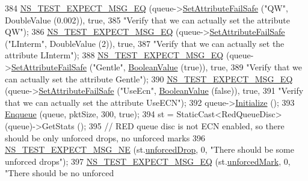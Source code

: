 \begin{DoxyCode}
384   \hyperlink{group__testing_ga7304ba46a28d8cf08dfdfd6499cf7068}{NS\_TEST\_EXPECT\_MSG\_EQ} (queue->\hyperlink{classns3_1_1ObjectBase_aa7d333004e970f925a4ed5df275541b5}{SetAttributeFailSafe} (\textcolor{stringliteral}{"QW"}, 
      DoubleValue (0.002)), \textcolor{keyword}{true},
385                          \textcolor{stringliteral}{"Verify that we can actually set the attribute QW"});
386   \hyperlink{group__testing_ga7304ba46a28d8cf08dfdfd6499cf7068}{NS\_TEST\_EXPECT\_MSG\_EQ} (queue->\hyperlink{classns3_1_1ObjectBase_aa7d333004e970f925a4ed5df275541b5}{SetAttributeFailSafe} (\textcolor{stringliteral}{"LInterm"}, 
      DoubleValue (2)), \textcolor{keyword}{true},
387                          \textcolor{stringliteral}{"Verify that we can actually set the attribute LInterm"});
388   \hyperlink{group__testing_ga7304ba46a28d8cf08dfdfd6499cf7068}{NS\_TEST\_EXPECT\_MSG\_EQ} (queue->\hyperlink{classns3_1_1ObjectBase_aa7d333004e970f925a4ed5df275541b5}{SetAttributeFailSafe} (\textcolor{stringliteral}{"Gentle"}, 
      \hyperlink{classns3_1_1BooleanValue}{BooleanValue} (\textcolor{keyword}{true})), \textcolor{keyword}{true},
389                          \textcolor{stringliteral}{"Verify that we can actually set the attribute Gentle"});
390   \hyperlink{group__testing_ga7304ba46a28d8cf08dfdfd6499cf7068}{NS\_TEST\_EXPECT\_MSG\_EQ} (queue->\hyperlink{classns3_1_1ObjectBase_aa7d333004e970f925a4ed5df275541b5}{SetAttributeFailSafe} (\textcolor{stringliteral}{"UseEcn"}, 
      \hyperlink{classns3_1_1BooleanValue}{BooleanValue} (\textcolor{keyword}{false})), \textcolor{keyword}{true},
391                          \textcolor{stringliteral}{"Verify that we can actually set the attribute UseECN"});
392   queue->\hyperlink{classns3_1_1Object_af4411cb29971772fcd09203474a95078}{Initialize} ();
393   \hyperlink{classRedQueueDiscTestCase_a231b433374e4485d83bcca3088685e31}{Enqueue} (queue, pktSize, 300, \textcolor{keyword}{true});
394   st = StaticCast<RedQueueDisc> (queue)->GetStats ();
395   \textcolor{comment}{// RED queue disc is not ECN enabled, so there should be only unforced drops, no unforced marks}
396   \hyperlink{group__testing_ga6d4b162d26b8a930115b97dd5f3d9ed9}{NS\_TEST\_EXPECT\_MSG\_NE} (st.\hyperlink{structns3_1_1RedQueueDisc_1_1Stats_a242027f6eb7d30e2cd636c52080e2c73}{unforcedDrop}, 0, \textcolor{stringliteral}{"There should be some
       unforced drops"});
397   \hyperlink{group__testing_ga7304ba46a28d8cf08dfdfd6499cf7068}{NS\_TEST\_EXPECT\_MSG\_EQ} (st.\hyperlink{structns3_1_1RedQueueDisc_1_1Stats_aa974fb3ee97c612e0a6d77259a3672df}{unforcedMark}, 0, \textcolor{stringliteral}{"There should be no unforced
}
\end{DoxyCode}
